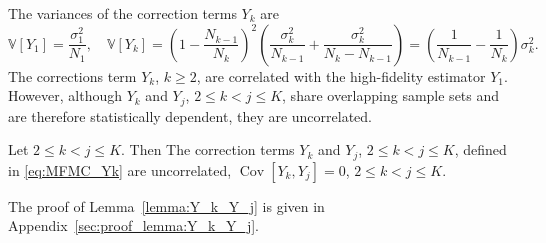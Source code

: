 The variances of the correction terms $Y_k$ are
\begin{equation}\label{eq:Var_Yk}
    \mathbb{V}\left[Y_1\right] = \frac{\sigma_1^2}{N_1}, \quad \mathbb{V}\left[Y_k\right] = \left(1-\frac{N_{k-1}}{N_k}\right)^2\left(\frac{\sigma_k^2}{N_{k-1}}+\frac{\sigma_k^2}{N_k-N_{k-1}}\right) = \left(\frac{1}{N_{k-1}} - \frac{1}{N_k}\right)\sigma_k^2.
\end{equation}
The corrections term $Y_k$, $k\ge 2$, are correlated with the high-fidelity estimator $Y_1$.
However, although $Y_k$ and $Y_j$, $2\le k<j \le K$, share overlapping sample sets and are therefore statistically dependent, they are uncorrelated.

\begin{lemma}\label{lemma:Y_k_Y_j}
Let $2\le k<j\le K$. Then 
  The correction terms $Y_k$ and $Y_j$, $2\le k<j \le K$, defined in \eqref{eq:MFMC_Yk} are uncorrelated,
  $\operatorname{Cov} [Y_k,Y_j ]=0$,  $2\le k<j \le K$.
\end{lemma}
The proof of Lemma~\ref{lemma:Y_k_Y_j} is given in Appendix~\ref{sec:proof_lemma:Y_k_Y_j}.

